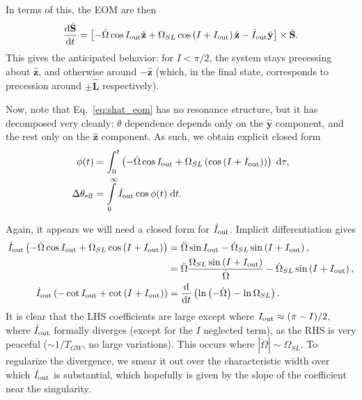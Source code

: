 \documentclass[11pt,
        usenames, %
        dvipsnames %
    ]{article}
\newcommand*{\rd}[2]{\frac{\mathrm{d}#1}{\mathrm{d}#2}}
\newcommand*{\bm}[1]{\boldsymbol{\mathbf{#1}}}
\newcommand*{\uv}[1]{\hat{\bm{#1}}}
\newcommand*{\abs}[1]{\left|#1\right|}
\newcommand*{\p}[1]{\left(#1\right)}
\newcommand*{\s}[1]{\left[#1\right]}
\begin{document}
In terms of this, the EOM are then
\begin{equation}
    \rd{\uv{S}}{t} = \s{-\dot{\Omega} \cos I_{\rm out}\uv{z} + \Omega_{SL}
        \cos \p{I + I_{\rm out}}\uv{z} - \dot{I}_{\rm out}\uv{y}} \times
        \uv{S}.\label{eq:shat_eom}
\end{equation}
This gives the anticipated behavior: for $I < \pi/2$, the system stays
precessing about $\uv{z}$, and otherwise around $-\uv{z}$ (which, in the final
state, corresponds to precession around $\pm \uv{L}$ respectively).

Now, note that Eq.~\eqref{eq:shat_eom} has no resonance structure, but it has
decomposed very cleanly: $\theta$ dependence depends only on the $\uv{y}$
component, and the rest only on the $\uv{z}$ component. As such, we obtain
explicit closed form
\begin{align}
    \phi(t) &= \int_0^t \p{-\dot{\Omega}\cos I_{\rm out}
            + \Omega_{SL}\p{\cos \p{I + I_{\rm out}}}}\;\mathrm{d}\tau,\\
    \Delta \theta_{\rm eff}
        &= \int\limits_0^\infty \dot{I}_{\rm out}\cos \phi(t)\;\mathrm{d}t.
\end{align}

Again, it appears we will need a closed form for $\dot{I}_{\rm out}$. Implicit
differentiation gives
\begin{align}
    \dot{I}_{\rm out}\p{-\dot{\Omega}\cos I_{\rm out}
        + \Omega_{SL}\cos\p{I + I_{\rm out}}}
        &= \ddot{\Omega} \sin I_{\rm out} - \dot{\Omega}_{SL}
            \sin\p{I + I_{\rm out}},\\
        &= \ddot{\Omega}\frac{\Omega_{SL}\sin\p{I + I_{\rm out}}}{\dot{\Omega}}
            - \dot{\Omega}_{SL}\sin\p{I + I_{\rm out}},\\
    \dot{I}_{\rm out}\p{-\cot I_{\rm out} + \cot \p{I + I_{\rm out}}}
        &= \rd{}{t}\p{\ln \p{-\dot{\Omega}} - \ln
        \Omega_{SL}}.\label{eq:idot_out_sol}
\end{align}
It is clear that the LHS coefficients are large except where $I_{\rm out}
\approx (\pi - I) / 2$, where $\dot{I}_{\rm out}$ formally diverges (except for
the $\dot{I}$ neglected term), as the RHS is very peaceful ($\sim 1/T_{GW}$, no
large variations). This occurs where $\abs{\dot{\Omega}} \sim \Omega_{SL}$. To
regularize the divergence, we smear it out over the characteristic width over
which $\dot{I}_{\rm out}$ is substantial, which hopefully is given by the slope
of the coefficient near the singularity.
\end{document}
